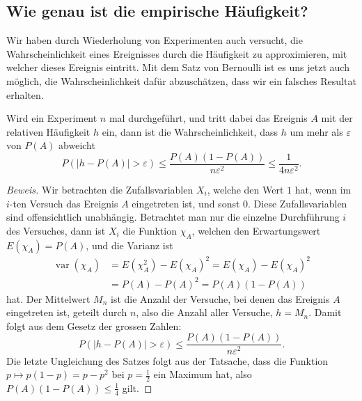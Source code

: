 \subsection{Wie genau ist die empirische Häufigkeit?}
Wir haben durch Wiederholung von Experimenten auch versucht, die
Wahrscheinlichkeit eines Ereignisses durch die Häufigkeit zu approximieren,
mit welcher dieses Ereignis eintritt.
Mit dem Satz von Bernoulli ist es uns jetzt auch möglich, die
Wahrscheinlichkeit dafür abzuschätzen, dass wir ein falsches
Resultat erhalten.
\begin{satz}
Wird ein Experiment $n$ mal durchgeführt, und tritt dabei das Ereignis $A$
mit der relativen Häufigkeit $h$ ein, dann ist die Wahrscheinlichkeit,
dass $h$ um mehr als $\varepsilon$ von $P(A)$ abweicht
\[
P(|h- P(A)|>\varepsilon)\le \frac{P(A)(1-P(A))}{n\varepsilon^2}
\le\frac{1}{4n\varepsilon^2}.
\]
\end{satz}
\begin{proof}[Beweis]
Wir betrachten die Zufallsvariablen $X_i$, welche den Wert $1$ hat,
wenn im $i$-ten Versuch das Ereignis $A$ eingetreten ist, und sonst $0$.
Diese Zufallsvariablen sind offensichtlich unabhängig.
Betrachtet man
nur die einzelne Durchführung $i$ des Versuches, dann ist $X_i$
die Funktion
$\chi_A$, welchen
den Erwartungswert $E(\chi_A)=P(A)$, und die Varianz ist
\begin{align*}
\operatorname{var}(\chi_A)&=E(\chi_A^2)-E(\chi_A)^2=E(\chi_A)-E(\chi_A)^2\\
&=P(A)-P(A)^2=P(A)(1-P(A))
\end{align*}
hat.
Der Mittelwert $M_n$ ist die Anzahl der Versuche, bei denen das Ereignis
$A$ eingetreten ist, geteilt durch $n$, also die Anzahl aller Versuche,
$h=M_n$.
Damit folgt aus dem Gesetz der grossen Zahlen:
\[
P(|h-P(A)|>\varepsilon)\le\frac{P(A)(1-P(A))}{n\varepsilon^2}.
\]
Die letzte Ungleichung des Satzes folgt aus der Tatsache, dass die Funktion
$p\mapsto p(1-p)=p-p^2$ bei $p=\frac12$ ein Maximum hat, also
$P(A)(1-P(A))\le\frac14$ gilt.
\end{proof}

